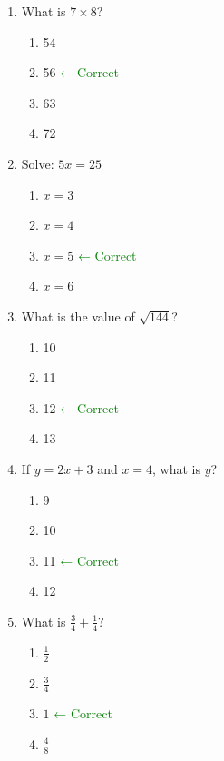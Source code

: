 \documentclass[12pt]{article}
\begin{document}
\begin{enumerate}[label=\textbf{\arabic*.}]

\item What is $7 \times 8$?
\begin{enumerate}[label=\Alph*)]
    \item 54
    \item 56 \textcolor{green}{← Correct}
    \item 63
    \item 72
\end{enumerate}

\item Solve: $5x = 25$
\begin{enumerate}[label=\Alph*)]
    \item $x = 3$
    \item $x = 4$
    \item $x = 5$ \textcolor{green}{← Correct}
    \item $x = 6$
\end{enumerate}

\item What is the value of $\sqrt{144}$?
\begin{enumerate}[label=\Alph*)]
    \item 10
    \item 11
    \item 12 \textcolor{green}{← Correct}
    \item 13
\end{enumerate}

\item If $y = 2x + 3$ and $x = 4$, what is $y$?
\begin{enumerate}[label=\Alph*)]
    \item 9
    \item 10
    \item 11 \textcolor{green}{← Correct}
    \item 12
\end{enumerate}

\item What is $\frac{3}{4} + \frac{1}{4}$?
\begin{enumerate}[label=\Alph*)]
    \item $\frac{1}{2}$
    \item $\frac{3}{4}$
    \item $1$ \textcolor{green}{← Correct}
    \item $\frac{4}{8}$
\end{enumerate}


\end{enumerate}
\end{document}
